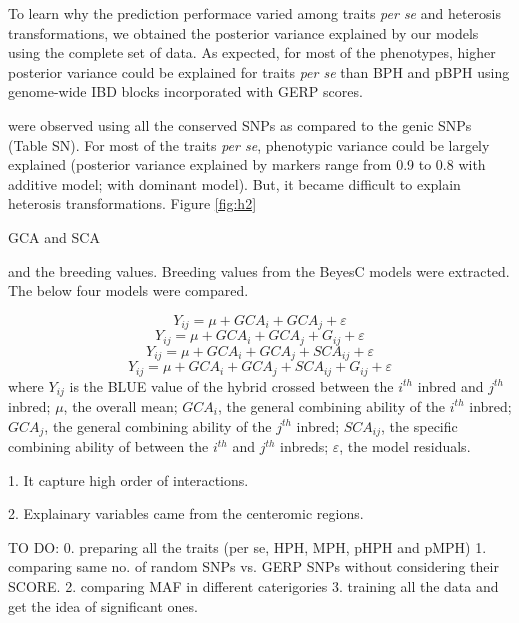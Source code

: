 \documentclass[9pt,twocolumn,twoside]{gsajnl}
\begin{document}
To learn why the prediction performace varied among traits \emph{per se} and heterosis transformations, we obtained the posterior variance explained by our models using the complete set of data. As expected, for most of the phenotypes, higher posterior variance could be explained for traits \emph{per se} than BPH and pBPH using genome-wide IBD blocks incorporated with GERP scores. 

were observed using all the conserved SNPs as compared to the genic SNPs (Table SN). For most of the traits \emph{per se}, phenotypic variance could be largely explained (posterior variance explained by markers range from 0.9 to 0.8 with additive model; with dominant model). But, it became difficult to explain heterosis transformations. Figure \ref{fig:h2}

GCA and SCA

and the breeding values.
Breeding values from the BeyesC models were extracted. The below four models were compared. 


\begin{equation}
Y_{ij} = \mu + GCA_{i} + GCA_{j} + \varepsilon
\label{eq:refname1}
\end{equation}
\begin{equation}
Y_{ij} = \mu + GCA_{i} + GCA_{j} +  G_{ij} + \varepsilon
\label{eq:refname2}
\end{equation}
\begin{equation}
Y_{ij} = \mu + GCA_{i} + GCA_{j} + SCA_{ij} + \varepsilon
\label{eq:refname3}
\end{equation}
\begin{equation}
Y_{ij} = \mu + GCA_{i} + GCA_{j} + SCA_{ij} + G_{ij} + \varepsilon
\label{eq:refname4}
\end{equation}
where 
$Y_{ij}$ is the BLUE value of the hybrid crossed between the $i^{th}$ inbred and $j^{th}$ inbred; 
$\mu$, the overall mean; 
$GCA_{i}$, the general combining ability of the $i^{th}$ inbred;
$GCA_{j}$, the general combining ability of the $j^{th}$ inbred;
$SCA_{ij}$, the specific combining ability of between the $i^{th}$ and $j^{th}$ inbreds;
$\varepsilon$, the model residuals.


1. It capture high order of interactions.  

2. Explainary variables came from the centeromic regions.

TO DO:
0. preparing all the traits (per se, HPH, MPH, pHPH and pMPH)
1. comparing same no. of random SNPs vs. GERP SNPs without considering their SCORE.
2. comparing MAF in different caterigories
3. training all the data and get the idea of significant ones.
\end{document}
